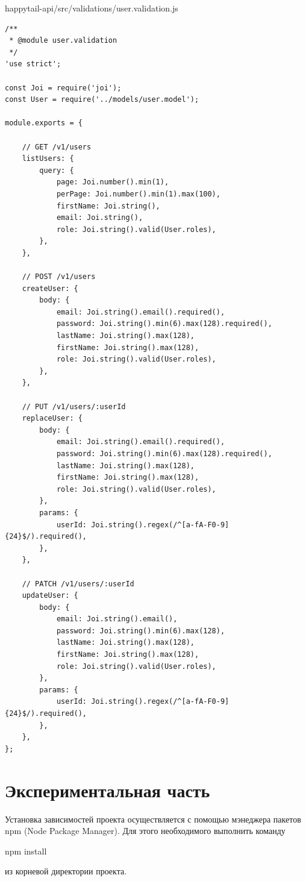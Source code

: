 \documentclass[12pt]{article}
\begin{document}
  \normalsize
 happytail-api/src/validations/user.validation.js
 \footnotesize
\begin{verbatim}
/**
 * @module user.validation
 */
'use strict';

const Joi = require('joi');
const User = require('../models/user.model');

module.exports = {

    // GET /v1/users
    listUsers: {
        query: {
            page: Joi.number().min(1),
            perPage: Joi.number().min(1).max(100),
            firstName: Joi.string(),
            email: Joi.string(),
            role: Joi.string().valid(User.roles),
        },
    },

    // POST /v1/users
    createUser: {
        body: {
            email: Joi.string().email().required(),
            password: Joi.string().min(6).max(128).required(),
            lastName: Joi.string().max(128),
            firstName: Joi.string().max(128),
            role: Joi.string().valid(User.roles),
        },
    },

    // PUT /v1/users/:userId
    replaceUser: {
        body: {
            email: Joi.string().email().required(),
            password: Joi.string().min(6).max(128).required(),
            lastName: Joi.string().max(128),
            firstName: Joi.string().max(128),
            role: Joi.string().valid(User.roles),
        },
        params: {
            userId: Joi.string().regex(/^[a-fA-F0-9]{24}$/).required(),
        },
    },

    // PATCH /v1/users/:userId
    updateUser: {
        body: {
            email: Joi.string().email(),
            password: Joi.string().min(6).max(128),
            lastName: Joi.string().max(128),
            firstName: Joi.string().max(128),
            role: Joi.string().valid(User.roles),
        },
        params: {
            userId: Joi.string().regex(/^[a-fA-F0-9]{24}$/).required(),
        },
    },
};

 \end{verbatim}
    \normalsize
 \section*{Экспериментальная часть}
 Установка зависимостей проекта осуществляется с помощью мэнеджера пакетов npm (Node
Package Manager).
Для этого необходимого выполнить команду

npm install

из корневой директории проекта.
\end{document}
